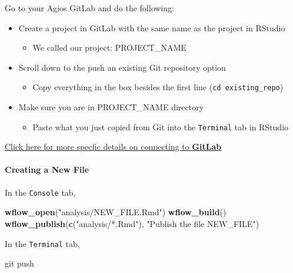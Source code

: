 \documentclass[openany]{article}
\newenvironment{Shaded}{\begin{snugshade}}{\end{snugshade}}
\newcommand{\KeywordTok}[1]{\textcolor[rgb]{0.13,0.29,0.53}{\textbf{#1}}}
\newcommand{\NormalTok}[1]{#1}
\newcommand{\StringTok}[1]{\textcolor[rgb]{0.31,0.60,0.02}{#1}}
\providecommand{\tightlist}{%
  \setlength{\itemsep}{0pt}\setlength{\parskip}{0pt}}
\let\oldparagraph\paragraph
\renewcommand{\paragraph}[1]{\oldparagraph{#1}\mbox{}}
\begin{document}
Go to your Agios GitLab and do the following:

\begin{itemize}
\tightlist
\item
  Create a project in GitLab with the same name as the project in RStudio

  \begin{itemize}
  \tightlist
  \item
    We called our project: PROJECT\_NAME
  \end{itemize}
\item
  Scroll down to the push an existing Git repository option

  \begin{itemize}
  \tightlist
  \item
    Copy everything in the box besides the first line (\texttt{cd\ existing\_repo})
  \end{itemize}
\item
  Make sure you are in PROJECT\_NAME directory

  \begin{itemize}
  \tightlist
  \item
    Paste what you just copied from Git into the \texttt{Terminal} tab in RStudio
  \end{itemize}
\end{itemize}

\protect\hyperlink{connecting-to-gitlab-1}{Click here for more specfic details on connecting to \textbf{GitLab}}

\hypertarget{creating-a-new-file}{%
\paragraph{Creating a New File}\label{creating-a-new-file}}

In the \texttt{Console} tab,

\begin{Shaded}
\begin{Highlighting}[]
\KeywordTok{wflow_open}\NormalTok{(}\StringTok{"analysis/NEW_FILE.Rmd"}\NormalTok{)}
\KeywordTok{wflow_build}\NormalTok{()}
\KeywordTok{wflow_publish}\NormalTok{(}\KeywordTok{c}\NormalTok{(}\StringTok{"analysis/*.Rmd"}\NormalTok{), }
    \StringTok{"Publish the file NEW_FILE"}\NormalTok{)}
\end{Highlighting}
\end{Shaded}

In the \texttt{Terminal} tab,

\begin{Shaded}
\begin{Highlighting}[]
\NormalTok{git push}
\end{Highlighting}
\end{Shaded}
\end{document}
